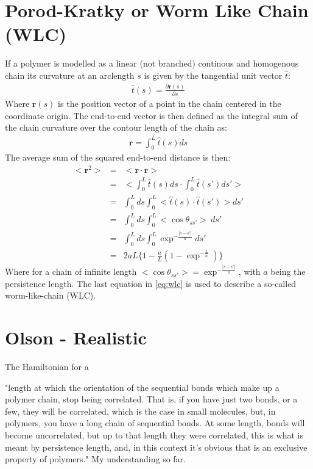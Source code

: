 \section{Porod-Kratky or Worm Like Chain (WLC)}
If a polymer is modelled as a linear (not branched) continous and
homogenous chain its curvature at an arclength $s$ is given by the
tangential unit vector $\hat{t}$:
\begin{gather}
\hat{t}(s)=\frac{\partial{\textbf{r}(s)}}{\partial{s}}
\end{gather}
Where $\textbf{r}(s)$ is the position vector of a point in the chain
centered in the coordinate origin.
The end-to-end vector is then defined as the integral sum of the chain
curvature over the contour length of the chain as:
\begin{gather}
\textbf{r}=\int_{0}^{L}\hat{t}(s)ds
\end{gather}
The average sum of the squared end-to-end distance is then:
\begin{eqnarray}
\label{eq:wlc}
<\textbf{r}^2> & = & <\textbf{r} \cdot \textbf{r}> \nonumber \\
               & = & <\int_{0}^{L}\hat{t}(s)ds \cdot \int_{0}^{L}\hat{t}(s')ds' >\nonumber \\
               & = & \int_{0}^{L} ds \int_{0}^{L}<\hat{t}(s) \cdot \hat{t}(s')>ds' \nonumber \\
               & = & \int_{0}^{L} ds \int_{0}^{L} <\cos{\theta}_{ss'}>~ ds' \nonumber \\
               & = & \int_{0}^{L} ds \int_{0}^{L} \exp^{-\frac{|s-s'|}{a}} ds' \nonumber \\
               & = & 2aL \{ 1 - \frac{a}{L}(1-\exp^{-\frac{L}{a}})\}
\end{eqnarray}
Where  for   a  chain  of  infinite   length  $<\cos{\theta_{ss'}}>  =
\exp^{-\frac{|s-s'|}{a}}$, with $a$ being the persistence length.  The
last   equation  in   \ref{eq:wlc}   is  used   to   describe  a   so-called
worm-like-chain (WLC).

\section{Olson - Realistic}



The Hamiltonian for a \cite{czapla2009}






"length at which the orientation of the sequential bonds which make up
a polymer chain, stop being correlated.  That is, if you have just two
bonds, or a  few, they will be correlated, which is  the case in small
molecules,  but, in  polymers, you  have  a long  chain of  sequential
bonds. At some length, bonds  will become uncorrelated, but up to that
length  they were  correlated, this  is what  is meant  by persistence
length,  and,  in this  context  it's  obvious  that is  an  exclusive
property of polymers." My understanding so far.






